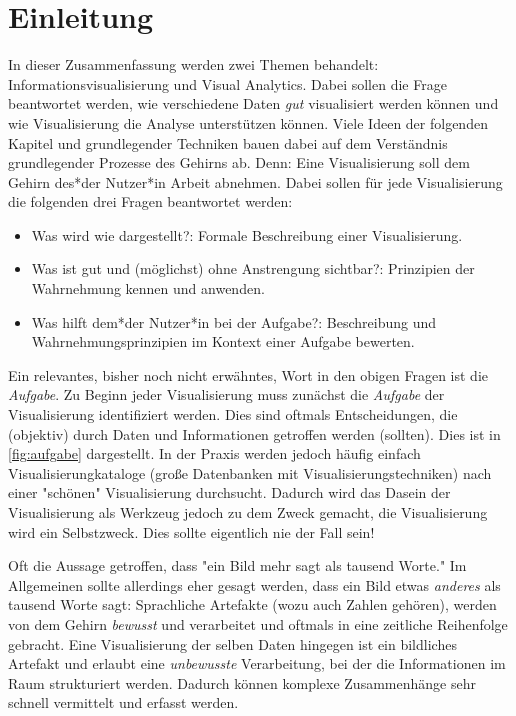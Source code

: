 \chapter{Einleitung}
	In dieser Zusammenfassung werden zwei Themen behandelt: Informationsvisualisierung und Visual Analytics. Dabei sollen die Frage beantwortet werden, wie verschiedene Daten \emph{gut} visualisiert werden können und wie Visualisierung die Analyse unterstützen können. Viele Ideen der folgenden Kapitel und grundlegender Techniken bauen dabei auf dem Verständnis grundlegender Prozesse des Gehirns ab. Denn: Eine Visualisierung soll dem Gehirn des*der Nutzer*in Arbeit abnehmen. Dabei sollen für jede Visualisierung die folgenden drei Fragen beantwortet werden:
	\begin{itemize}
		\item Was wird wie dargestellt?: Formale Beschreibung einer Visualisierung.
		\item Was ist gut und (möglichst) ohne Anstrengung sichtbar?: Prinzipien der Wahrnehmung kennen und anwenden.
		\item Was hilft dem*der Nutzer*in bei der Aufgabe?: Beschreibung und Wahrnehmungsprinzipien im Kontext einer Aufgabe bewerten.
	\end{itemize}
	Ein relevantes, bisher noch nicht erwähntes, Wort in den obigen Fragen ist die \emph{Aufgabe}. Zu Beginn jeder Visualisierung muss zunächst die \emph{Aufgabe} der Visualisierung identifiziert werden. Dies sind oftmals Entscheidungen, die (objektiv) durch Daten und Informationen getroffen werden (sollten). Dies ist in \autoref{fig:aufgabe} dargestellt. In der Praxis werden jedoch häufig einfach Visualisierungkataloge (große Datenbanken mit Visualisierungstechniken) nach einer "schönen" Visualisierung durchsucht. Dadurch wird das Dasein der Visualisierung als Werkzeug jedoch zu dem Zweck gemacht, \dh die Visualisierung wird ein Selbstzweck. Dies sollte eigentlich nie der Fall sein!

	Oft die Aussage getroffen, dass "ein Bild mehr sagt als tausend Worte." Im Allgemeinen sollte allerdings eher gesagt werden, dass ein Bild etwas \emph{anderes} als tausend Worte sagt: Sprachliche Artefakte (wozu auch Zahlen gehören), werden von dem Gehirn \emph{bewusst} und verarbeitet und oftmals in eine zeitliche Reihenfolge gebracht. Eine Visualisierung der selben Daten hingegen ist ein bildliches Artefakt und erlaubt eine \emph{unbewusste} Verarbeitung, bei der die Informationen im Raum strukturiert werden. Dadurch können komplexe Zusammenhänge sehr schnell vermittelt und erfasst werden.

